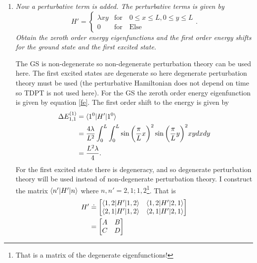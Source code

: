 \begin{example}
\begin{enumerate}
		\item \emph{Now a perturbative term is added. The perturbative terms is given by}
		\begin{equation}
			H'=\begin{cases} \lambda xy &\mbox{for} \quad 0\leq x\leq L, 0\leq y \leq L \\ 
				0 & \mbox{for} \quad \mbox{Else}  \end{cases} .
		\end{equation} 
		\emph{Obtain the zeroth order energy eigenfunctions and the first order energy shifts for the ground state and the first excited state.}\newline
		
		The GS is non-degenerate so non-degenerate perturbation theory can be used here. The first excited states are degenerate so here degenerate perturbation theory must be used (the perturbative Hamiltonian does not depend on time so TDPT is not used here).\newline 
		For the GS the zeroth order energy eigenfunction is given by equation \eqref{fe}. The first order shift to the energy is given by
		\begin{equation}
			\begin{split}
				\Delta E_{1,1}^{(1)}&= \braket{1^0|H'|1^0}\\
				&=\frac{4\lambda}{L^2}\int_{0}^{L}\int_{0}^{L}\sin\bigg(\frac{\pi}{L}x\bigg)^2\sin\bigg(\frac{\pi}{L}y\bigg)^2xydxdy\\
				&=\frac{L^2\lambda}{4}.
			\end{split}
			\label{FPE1}
		\end{equation} 
		For the first excited state there is degeneracy, and so degenerate perturbation theory will be used instead of non-degenerate perturbation theory. I construct the matrix $\braket{n'|H'|n}$ where $n,n'=2,1;1,2$\footnote{That is a matrix of the degenerate eigenfunctions!}. That is
		\begin{equation}
			\begin{split}
				H'&\doteq\begin{bmatrix}
					\braket{1,2|H'|1,2} & \braket{1,2|H'|2,1}\\
					\braket{2,1|H'|1,2} & \braket{2,1|H'|2,1}\\
				\end{bmatrix}\\
				&=\begin{bmatrix}
					A& B\\
					C& D\\
				\end{bmatrix}\\

\end{split}
\end{equation}
\end{enumerate}
\end{example}
